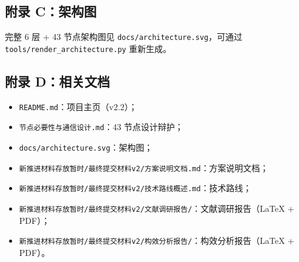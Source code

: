 \documentclass[11pt,a4paper]{article}
\begin{document}
\subsection{附录 C：架构图}

完整 6 层 + 43 节点架构图见 \texttt{docs/architecture.svg}，可通过 \texttt{tools/render\_architecture.py} 重新生成。

\subsection{附录 D：相关文档}

\begin{itemize}[leftmargin=2em]
\item \texttt{README.md}：项目主页（v2.2）；
\item \texttt{节点必要性与通信设计.md}：43 节点设计辩护；
\item \texttt{docs/architecture.svg}：架构图；
\item \texttt{新推进材料存放暂时/最终提交材料v2/方案说明文档.md}：方案说明文档；
\item \texttt{新推进材料存放暂时/最终提交材料v2/技术路线概述.md}：技术路线；
\item \texttt{新推进材料存放暂时/最终提交材料v2/文献调研报告/}：文献调研报告（LaTeX + PDF）；
\item \texttt{新推进材料存放暂时/最终提交材料v2/构效分析报告/}：构效分析报告（LaTeX + PDF）。
\end{itemize}



\end{document}
